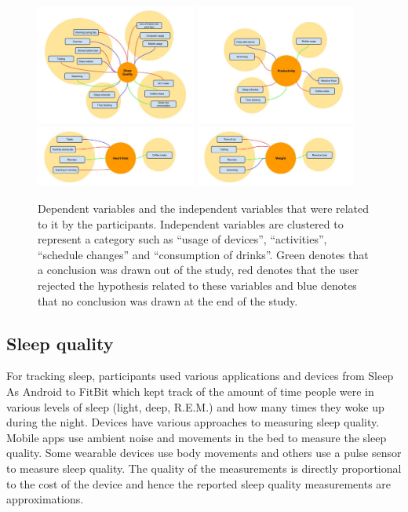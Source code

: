 \begin{figure}[!t]\centering
\includegraphics[width=0.47\textwidth]{images/Sleep_quality.jpg}
\includegraphics[width=0.47\textwidth]{images/Productivity.jpg}
\includegraphics[width=0.47\textwidth]{images/Heart_rate.jpg}
\includegraphics[width=0.47\textwidth]{images/Weight.jpg}
\caption{\footnotesize Dependent variables and the independent variables that were related to it by the participants. Independent variables are clustered to represent a category such as \enquote{usage of devices}, \enquote{activities}, \enquote{schedule changes} and \enquote{consumption of drinks}. Green denotes that a conclusion was drawn out of the study, red denotes that the user rejected the hypothesis related to these variables and  blue denotes that no conclusion was drawn at the end of the study. \label{fig:dependentvsindependent} 
}
\end{figure}

\subsection{Sleep quality}
For tracking sleep, participants used various applications and devices from Sleep As Android to FitBit which kept track of the amount of time people were in various levels of sleep (light, deep, R.E.M.) and how many times they woke up during the night. Devices have various approaches to measuring sleep quality. Mobile apps use ambient noise and movements in the bed to measure the sleep quality. Some wearable devices use body movements and others use a pulse sensor to measure sleep quality. The quality of the measurements is directly proportional to the cost of the device and hence the reported sleep quality measurements are approximations. 

